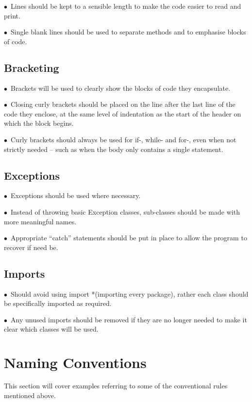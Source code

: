 \documentclass[english]{article}
\begin{document}
$\bullet$\ Lines should be kept to a sensible length to make the code easier to read and print.\par	
	$\bullet$\ Single blank lines should be used to separate methods and to emphasise blocks of code.\par	
		
				\subsection{Bracketing}
$\bullet$\ Brackets will be used to clearly show the blocks of code they encapsulate.\par
$\bullet$\ Closing curly brackets should be placed on the line after the last line of the code they enclose, at the same level of indentation as the start of the header on which the block begins. \par
$\bullet$\ Curly brackets should always be used for if-, while- and for-, even when not strictly needed – such as when the body only contains a single statement.\par
\subsection{Exceptions}
$\bullet$\ Exceptions should be used where necessary.\par
$\bullet$\ Instead of throwing basic Exception classes, sub-classes should be made with more meaningful names.\par
$\bullet$\ Appropriate “catch” statements should be put in place to allow the program to recover if need be.\par




\subsection{Imports}
$\bullet$\ Should avoid using import *(importing every package), rather each class should be specifically imported as required.\par

$\bullet$\ Any unused imports should be removed if they are no longer needed to make it clear which classes will be used.\par


				
			\section{Naming Conventions	}
			This section will cover examples referring to some of the conventional rules mentioned above.
				
\end{document}
